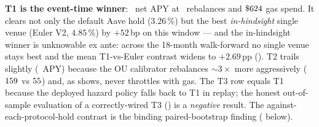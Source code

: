 \textbf{T1 is the event-time winner}: \TOneAPY\ net APY at
\TOneNRebal\ rebalances and $\$624$ gas spend.  It clears not
only the default Aave hold ($3.26$\,\%) but the best
\emph{in-hindsight} single venue (Euler V2, $4.85$\,\%) by $+52$\,bp
on this window --- and the in-hindsight winner is unknowable ex ante:
across the 18-month walk-forward no single venue stays best and the
mean T1-vs-Euler contrast widens to $+2.69$\,pp
().  T2 trails
slightly (\TTwoAPY\ APY) because the OU calibrator rebalances $\sim
3\times$ more aggressively ($159$ vs $55$) and, as
 shows, never throttles with gas.  The T3 row
equals T1 because the deployed hazard policy falls back to T1 in
replay; the honest out-of-sample evaluation of a correctly-wired T3
() is a \emph{negative} result.  The
against-each-protocol-hold contrast is the binding paired-bootstrap
finding ( below).


